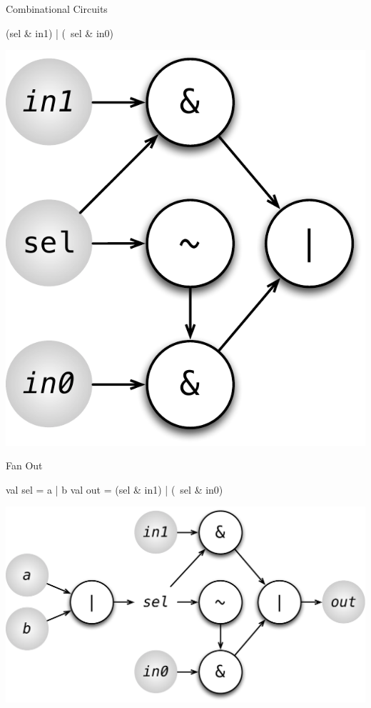 \documentclass[xcolor=pdflatex,dvipsnames,table]{beamer}
\begin{document}
\begin{frame}[fragile]{Combinational Circuits}

\begin{scala}
(sel & in1) | (~sel & in0)
\end{scala}

\begin{center}
\includegraphics[height=0.7\textheight]{figs/mux2-circuit.pdf} 
\end{center}

\end{frame}

\begin{frame}[fragile]{Fan Out}

\begin{scala}
val sel = a | b
val out = (sel & in1) | (~sel & in0)
\end{scala}

\begin{center}
\includegraphics[height=0.7\textheight]{figs/mux2-named-sel.pdf} 
\end{center}

\end{frame}
\end{document}

